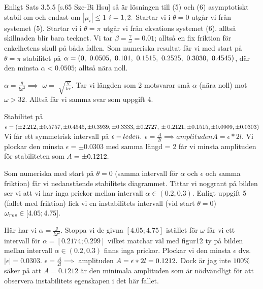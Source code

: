 \documentclass{article}
\begin{document}
Enligt Sats 3.5.5 [s.65 Sze-Bi Hsu] så är lösningen till (5) och (6) asymptotiskt stabil om och endast om $ |{\mu}_i| \leq 1$
$ i = 1,2. \newline $
Startar vi i ${\theta} = 0$ utgår vi från systemet (5).\newline
Startar vi i ${\theta} = {\pi}$ utgår vi från ekvations systemet (6). alltså skillnaden blir bara tecknet. \newline Vi tar ${\beta}=\frac{\gamma}{\omega} = 0.01$; alltså en fix friktion för enkelhetens skull på båda fallen. \newline 
Som numeriska resultat får vi med start på ${\theta} = {\pi}$ stabilitet på $\newline {\alpha} = (0,\ 0.0505,\ 0.101,\ 0.1515,\ 0.2525,\ 0.3030,\ 0.4545)$, där den minsta ${\alpha}<  0.0505$; alltså nära noll.

${\alpha}=\frac{g}{l{\omega}^{2}} \implies$ ${\omega} = \sqrt[]{\frac{g}{l{\alpha}}}$. Tar vi längden som 2 motsvarar små ${\alpha}$ (nära noll) mot ${\omega} > 32$. Alltså får vi samma svar som uppgift 4.\newline 

Stabilitet på $ {\epsilon} = (\pm 2.212,\pm 0.5757,\pm 0.4545,\pm 0.3939,\pm 0.3333, \pm 0.2727,\newline \pm 0.2121,\pm 0.1515,\pm 0.0909,\pm 0.0303)$ Vi får ett symmetrisk intervall på ${\epsilon}-leden. \newline$ ${\epsilon} = \frac{A}{2l} \implies amplituden A = {\epsilon}*2l$.
Vi plockar den minsta ${\epsilon} = \pm 0.0303$ med samma längd = 2 får vi minsta amplituden för stabiliteten som $A = \pm 0.1212. \newline$

\bigbreak

Som numeriska med start på $ {\theta} = 0$ (samma intervall för ${\alpha}$ och ${\epsilon}$ och samma friktion) får vi nedanstående stabilitets diagrammet. \newline
Tittar vi noggrant på bilden ser vi att vi har inga prickor mellan intervall 
${\alpha}\in (0.2, 0.3) $. \newline
Enligt uppgift 5 (fallet med friktion) fick vi en  instabilitets intervall (vid start ${\theta} = 0$)  ${\omega}_{res} \in [4.05; 4.75]. \newline$

Här har vi ${\alpha}=\frac{g}{l{\omega}^{2}}$. Stoppa vi de givna $[4.05; 4.75]$ istället för ${\omega}$ får vi ett intervall för ${\alpha} = [0.2174; 0.299]$ vilket matchar väl med figur12 ty på bilden mellan intervall ${\alpha}\in (0.2, 0.3) $ finns inga prickor. \newline
Plockar vi den minsta ${\epsilon}$ dvs. $|{\epsilon}| = 0.0303$. ${\epsilon} = \frac{A}{2l} \implies$ amplituden $A = {\epsilon}*2l = 0.1212. \newline$
Dock är jag inte $100\%$ säker på att $A = 0.1212$ är den minimala amplituden som är nödvändligt för att observera instabilitets egenskapen i det här fallet. 
\end{document}

